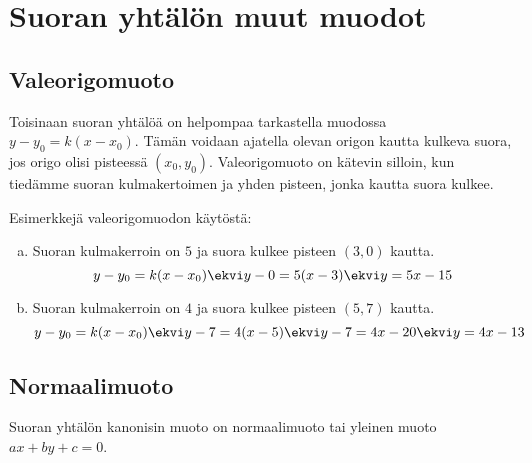 \section{Suoran yhtälön muut muodot}


\subsection*{Valeorigomuoto} %

Toisinaan suoran yhtälöä on helpompaa tarkastella muodossa $y-y_0=k(x-x_0)$.
Tämän voidaan ajatella olevan origon kautta kulkeva suora, jos origo olisi
pisteessä $(x_0, y_0)$. Valeorigomuoto on kätevin silloin, kun tiedämme suoran
kulmakertoimen ja yhden pisteen, jonka kautta suora kulkee.

\begin{esimerkki}
    Esimerkkejä valeorigomuodon käytöstä:
    \begin{enumerate}[a)]
        \item Suoran kulmakerroin on $5$ ja suora kulkee pisteen $(3,0)$ kautta.
        \[y-y_0 = k(x-x_0) \ekvi y-0 = 5(x-3) \ekvi y = 5x-15\]
        \item Suoran kulmakerroin on $4$ ja suora kulkee pisteen $(5,7)$ kautta.
        \[y-y_0 = k(x-x_0) \ekvi y-7 = 4(x-5) \ekvi y-7 = 4x-20 \ekvi y = 4x-13\]
    \end{enumerate}
\end{esimerkki}

\subsection*{Normaalimuoto}

Suoran yhtälön kanonisin muoto on normaalimuoto tai yleinen muoto $ax+by+c=0$.


